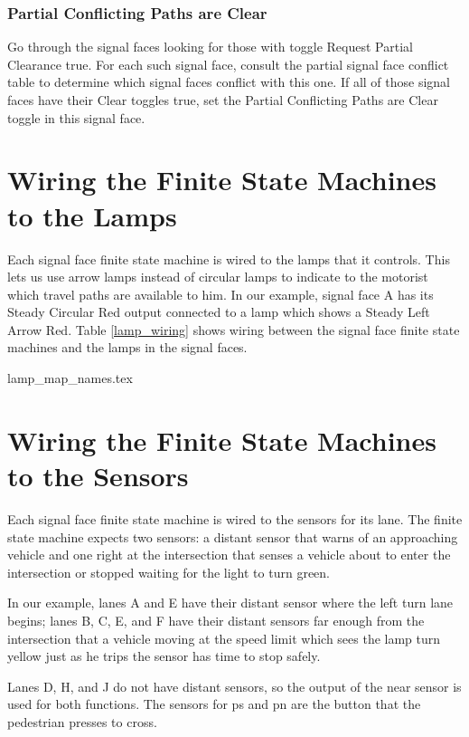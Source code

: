 \documentclass[letterpaper,twoside]{article}
\begin{document}
\subsubsection{Partial Conflicting Paths are Clear}

Go through the signal faces looking for those with toggle Request Partial
Clearance true.  For each such signal face, consult the partial
signal face conflict table to determine which signal faces conflict
with this one.  If all of those signal faces have their Clear toggles
true, set the Partial Conflicting Paths are Clear toggle in this
signal face.

\section{Wiring the Finite State Machines to the Lamps}

Each signal face finite state machine is wired to the lamps that
it controls.  This lets us use arrow lamps instead of circular lamps
to indicate to the motorist which travel paths are available to him.
In our example, signal face A has its Steady Circular Red output
connected to a lamp which shows a Steady Left Arrow Red.
Table \ref{lamp_wiring} shows wiring between the signal face finite state
machines and the lamps in the signal faces.

 {lamp_map_names.tex}

\section{Wiring the Finite State Machines to the Sensors}

Each signal face finite state machine is wired to the sensors
for its lane.  The finite state machine expects two sensors:
a distant sensor that warns of an approaching vehicle and
one right at the intersection that senses a vehicle about
to enter the intersection or stopped waiting for the light
to turn green.

In our example, lanes A and E have their distant sensor where
the left turn lane begins; lanes B, C, E, and F have their
distant sensors far enough from the intersection that a vehicle
moving at the speed limit which sees the lamp turn yellow
just as he trips the sensor has time to stop safely.

Lanes D, H, and J do not have distant sensors, so the output
of the near sensor is used for both functions.  The sensors
for ps and pn are the button that the pedestrian presses
to cross.
\end{document}
